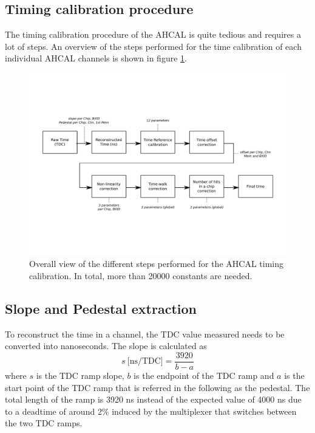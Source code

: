 \documentclass{JINST}
\begin{document}
\subsection{Timing calibration procedure}

The timing calibration procedure of the AHCAL is quite tedious and requires a lot of steps. An overview of the steps performed for the time calibration of each individual AHCAL channels is shown in figure \ref{fig:CalibOverview}.

\begin{figure}[htbp!]
	\centering
	\includegraphics[width=1\linewidth]{fig/TimeCalibOverview.pdf}
	\caption{Overall view of the different steps performed for the AHCAL timing calibration. In total, more than 20000 constants are needed.} \label{fig:CalibOverview}
\end{figure}

\subsection{Slope and Pedestal extraction}

To reconstruct the time in a channel, the TDC value measured needs to be converted into nanoseconds. The slope is calculated as
\begin{equation} \label{eq:slope}
	s \: \text{[ns/TDC]} = \frac{3920}{b - a}
\end{equation}
where $s$ is the TDC ramp slope, $b$ is the endpoint of the TDC ramp and $a$ is the start point of the TDC ramp that is referred in the following as the pedestal. The total length of the ramp is 3920 ns instead of the expected value of 4000 ns due to a deadtime of around 2\% \cite{Brianne2012} induced by the multiplexer that switches between the two TDC ramps.
\end{document}

